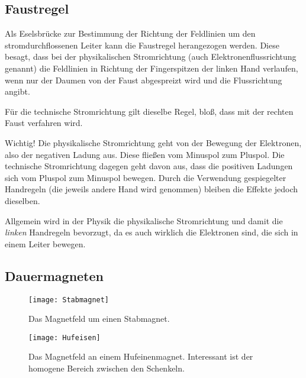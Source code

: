 \subsection{Faustregel}	\label{subsec:Faustregel}

Als Eselsbrücke zur Bestimmung der Richtung der Feldlinien um den stromdurchflossenen Leiter kann die \glqq Faustregel\grqq{} herangezogen werden. Diese besagt, dass bei der physikalischen Stromrichtung (auch Elektronenflussrichtung genannt) die Feldlinien in Richtung der Fingerspitzen der linken Hand verlaufen, wenn nur der Daumen von der Faust abgespreizt wird und die Flussrichtung angibt.

Für die technische Stromrichtung gilt dieselbe Regel, bloß, dass mit der rechten Faust verfahren wird.

\begin{leftbar}
	Wichtig! Die physikalische Stromrichtung geht von der Bewegung der Elektronen, also der negativen Ladung aus. Diese fließen vom Minuspol zum Pluspol. Die technische Stromrichtung dagegen geht davon aus, dass die positiven Ladungen sich vom Pluspol zum Minuspol bewegen. Durch die Verwendung gespiegelter Handregeln (die jeweils andere Hand wird genommen) bleiben die Effekte jedoch dieselben. 
	
	Allgemein wird in der Physik die physikalische Stromrichtung und damit die \emph{linken} Handregeln bevorzugt, da es auch wirklich die Elektronen sind, die sich in einem Leiter bewegen.
\end{leftbar}

\subsection{Dauermagneten}  	\label{subsec:DauermagnetFeld}

\hfill

\begin{figure}[ht!]
	\centering
	\begin{minipage}[b]{0.4\linewidth}
    	\texttt{[image: Stabmagnet]}
		\caption{Das Magnetfeld um einen Stabmagnet.}
	\end{minipage}
	\quad
	\begin{minipage}[b]{0.4\linewidth}
    	\texttt{[image: Hufeisen]}
		\caption{Das Magnetfeld an einem Hufeinenmagnet. Interessant ist der homogene Bereich zwischen den Schenkeln.}
	\end{minipage}
\end{figure}


